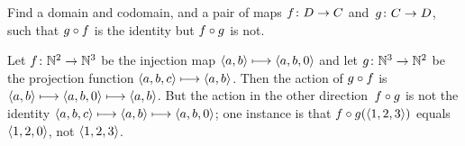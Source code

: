 \documentclass{ibl}  %
\begin{document}
\begin{problem}
\end{problem}

\begin{problem}
  Find a domain and codomain, and a pair of maps $\mbox{$f\colon D\to C$}$ 
  and~$\mbox{$g\colon C\to D$}$,
  such that $g\mathbin{\circ} f$ is the identity but $f\mathbin{\circ} g$
  is not.
\begin{answer}
Let $\mbox{$f\colon \mathbb{N}^2\to \mathbb{N}^3$}$ be the injection map
$\langle a,b\rangle\stackrel{}{\longmapsto}\langle a,b,0\rangle$
and let 
$\mbox{$g\colon \mathbb{N}^3\to \mathbb{N}^2$}$ be the projection function
$\langle a,b,c\rangle\stackrel{}{\longmapsto}\langle a,b\rangle$.
Then the action of $g\mathbin{\circ} f$ is 
$\langle a,b\rangle\stackrel{}{\longmapsto}\langle a,b,0\rangle\stackrel{}{\longmapsto}\langle a,b\rangle$.
But the action in the other direction~$f\mathbin{\circ} g$ is not the identity
$\langle a,b,c\rangle\stackrel{}{\longmapsto}\langle a,b\rangle\stackrel{}{\longmapsto}\langle a,b,0\rangle$;
one instance is that $f\mathbin{\circ} g(\langle1,2,3\rangle)$ equals
$\langle1,2,0\rangle$, not $\langle1,2,3\rangle$.     
\end{answer}
\end{problem}
\end{document}
